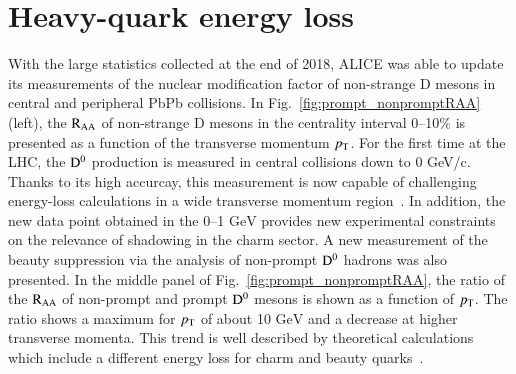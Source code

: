 \documentclass[3p,times,procedia]{elsarticle}
\newcommand{\GeV}{\mathrm{GeV}}
\newcommand{\pt}{p_{\rm T}}
\newcommand{\Dzero}{{\rm D^0}}
\newcommand{\RAA}{\rm R_{AA}}
\begin{document}
\section{Heavy-quark energy loss}
\label{eloss}
With the large statistics collected at the end of 2018, ALICE was able to update its measurements of the nuclear modification factor of 
non-strange D mesons in central and peripheral PbPb collisions. In Fig.~\ref{fig:prompt_nonpromptRAA} (left), the $\RAA$ of non-strange D mesons in the centrality 
interval 0--10$\%$ is presented as a function of the transverse momentum $\pt$. For the first time at the LHC, the $\Dzero$ production is measured 
in central collisions down to 0 GeV/c. Thanks to its high accurcay, this measurement is now capable of challenging energy-loss calculations in a wide 
transverse momentum region~\cite{bamps,tamu,phsd,sHQ,catania}. In addition, the new data point obtained in the 0--1 $\GeV$ provides new experimental constraints on the relevance of 
shadowing in the charm sector. A new measurement of the beauty suppression via the analysis of non-prompt $\Dzero$ hadrons 
was also presented. In the middle panel of Fig.~\ref{fig:prompt_nonpromptRAA}, the ratio of the $\RAA$ of non-prompt and prompt $\Dzero$ mesons is shown
as a function of $\pt$. The ratio shows a maximum for $\pt$ of about 10 $\GeV$ and a decrease at higher transverse momenta. This trend is well 
described by theoretical calculations which include a different energy loss for charm and beauty quarks~\cite{tamu,sHQ,cujet3}. 
\end{document}
